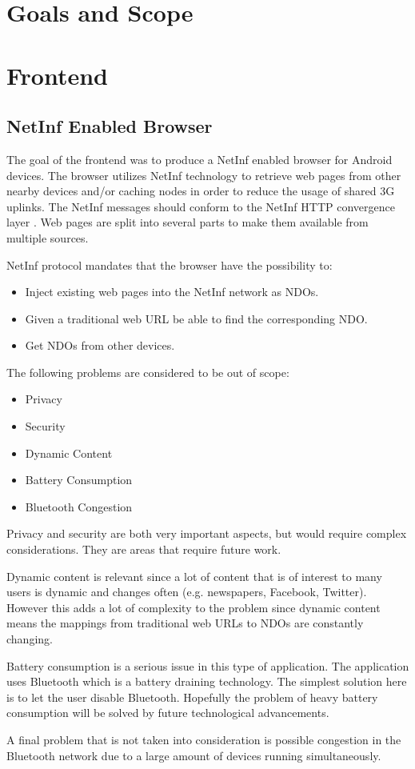 \section{Goals and Scope}

\section{Frontend}

\subsection{NetInf Enabled Browser}

The goal of the frontend was to produce a NetInf enabled browser for Android devices. The browser utilizes NetInf technology to retrieve web pages from other nearby devices and/or caching nodes in order to reduce the usage of shared 3G uplinks. The NetInf messages should conform to the NetInf HTTP convergence layer \cite{netinfproto}. Web pages are split into several parts to make them available from multiple sources.

NetInf protocol mandates that the browser have the possibility to:

\begin{itemize}
	\item Inject existing web pages into the NetInf network as NDOs.
	\item Given a traditional web URL be able to find the corresponding NDO.
	\item Get NDOs from other devices.
\end{itemize}

The following problems are considered to be out of scope:

\begin{itemize}
	\item Privacy
	\item Security
	\item Dynamic Content
	\item Battery Consumption
	\item Bluetooth Congestion
\end{itemize}

Privacy and security are both very important aspects, but would require complex considerations. They are areas that require future work.

Dynamic content is relevant since a lot of content that is of interest to many users is dynamic and changes often (e.g. newspapers, Facebook, Twitter). However this adds a lot of complexity to the problem since dynamic content means the mappings from traditional web URLs to NDOs are constantly changing.

Battery consumption is a serious issue in this type of application. The application uses Bluetooth which is a battery draining technology. The simplest solution here is to let the user disable Bluetooth. Hopefully the problem of heavy battery consumption will be solved by future technological advancements.

A final problem that is not taken into consideration is possible congestion in the Bluetooth network due to a large amount of devices running simultaneously.
